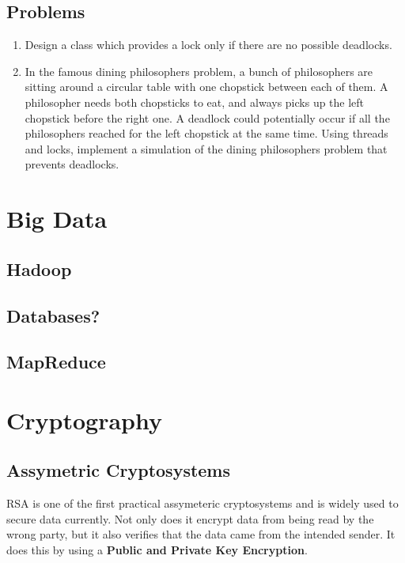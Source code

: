 \documentclass{article}
\begin{document}
	\subsection{Problems}
		\begin{enumerate}
			\item Design a class which provides a lock only if there are no possible deadlocks.
			\item In the famous dining philosophers problem, a bunch of philosophers are sitting around a circular table with one chopstick between each of them. A philosopher needs both chopsticks to eat, and always picks up the left chopstick before the right one. A deadlock could potentially occur if all the philosophers reached for the left chopstick at the same time. Using threads and locks, implement a simulation of the dining philosophers problem that prevents deadlocks.
		\end{enumerate}


\clearpage
\section{Big Data}
	\subsection{Hadoop}
	\subsection{Databases?}
	\subsection{MapReduce}


\clearpage
\section{Cryptography}
	\subsection{Assymetric Cryptosystems}
		RSA is one of the first practical assymeteric cryptosystems and is widely used to secure data currently. Not only does it encrypt data from being read by the wrong party, but it also verifies that the data came from the intended sender. It does this by using a {\bf Public and Private Key Encryption}.
\end{document}

